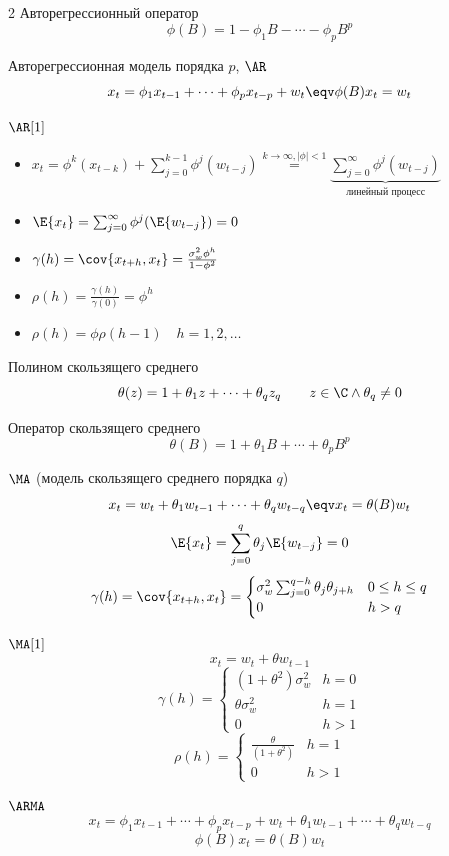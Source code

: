 \documentclass[landscape]{article}
\begin{document}
\begin{multicols*}{2}
Авторегрессионный оператор
\[\phi(B) = 1 - \phi_1B - \cdots - \phi_pB^p\]

Авторегрессионная модель порядка $p$, $\AR$
\[x_t = \phi_1 x_{t-1} + \cdots + \phi_p x_{t-p} + w_t \eqv \phi(B)x_t = w_t\]

$\AR[1]$
\begin{itemize}
  \item $x_t = \phi^k(x_{t-k}) + \displaystyle\sum_{j=0}^{k-1} \phi^j(w_{t-j})
    \stackrel{k\to\infty, |\phi| < 1}{=}
    \underbrace{\sum_{j=0}^\infty \phi^j(w_{t-j})}_{\text{линейный процесс}}$
\item $\E{x_t} = \sum_{j=0}^\infty\phi^j(\E{w_{t-j}}) = 0$
\item $\gamma(h) = \cov{x_{t+h},x_t} = \frac{\sigma_w^2\phi^h}{1-\phi^2}$
\item $\rho(h) = \frac{\gamma(h)}{\gamma(0)} = \phi^h$
\item $\rho(h) = \phi \rho(h-1) \quad h=1,2,\ldots$
\end{itemize}

Полином скользящего среднего
\[\theta(z) = 1 + \theta_1 z + \cdots + \theta_q z_q
\qquad z \in \C \wedge \theta_q \neq 0\]

Оператор скользящего среднего
\[\theta(B) = 1 + \theta_1B + \cdots + \theta_pB^p\]

$\MA$ (модель скользящего среднего порядка $q$)
\[x_t = w_t + \theta_1 w_{t-1} + \cdots + \theta_q w_{t-q}
\eqv x_t = \theta(B)w_t\]
\[\E{x_t} = \sum_{j=0}^q \theta_j\E{w_{t-j}} = 0\]
\[\gamma(h) = \cov{x_{t+h},x_t} = \begin{cases}
  \sigma_w^2\sum_{j=0}^{q-h} \theta_j\theta_{j+h} & 0 \le h \le q \\
  0 & h > q
\end{cases}\]

$\MA[1]$
\[x_t = w_t + \theta w_{t-1}\]
\[\gamma(h) = \begin{cases}
  (1+\theta^2)\sigma_w^2 & h = 0 \\
  \theta\sigma_w^2 & h = 1 \\
  0 & h > 1
\end{cases}\]
\[\rho(h) = \begin{cases}
  \frac{\theta}{(1+\theta^2)} & h = 1 \\
  0 & h > 1
\end{cases}\]

$\ARMA$
\[x_t = \phi_1 x_{t-1} + \cdots + \phi_p x_{t-p} + w_t + \theta_1 w_{t-1} +
\cdots + \theta_q w_{t-q}\]
\[\phi(B) x_t = \theta(B) w_t\]


\end{multicols*}
\end{document}
